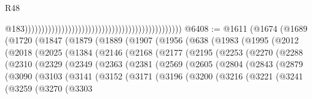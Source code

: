 \begin{lexlean}{R48}
\begin{coremodule}
                                                                                                  @183)))))))))))))))))))))))))))))))))))))))))))))))
@6408 := @1611
    (@1674
      (@1689
        (@1720
          (@1847
            (@1879
              (@1889
                (@1907
                  (@1956
                    (@638
                      (@1983
                        (@1995
                          (@2012
                            (@2018
                              (@2025
                                (@1384
                                  (@2146
                                    (@2168
                                      (@2177
                                        (@2195
                                          (@2253
                                            (@2270
                                              (@2288
                                                (@2310
                                                  (@2329
                                                    (@2349
                                                      (@2363
                                                        (@2381
                                                          (@2569
                                                            (@2605
                                                              (@2804
                                                                (@2843
                                                                  (@2879
                                                                    (@3090
                                                                      (@3103
                                                                        (@3141
                                                                          (@3152
                                                                            (@3171
                                                                              (@3196
                                                                                (@3200
                                                                                  (@3216
                                                                                    (@3221
                                                                                      (@3241
                                                                                        (@3259
                                                                                          (@3270
                                                                                            (@3303

\end{coremodule}
\end{lexlean}
